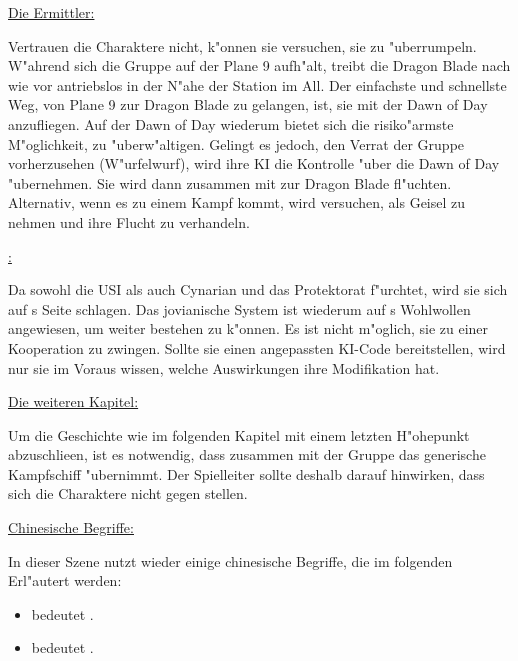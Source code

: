 \begin{remarks}	
	\underline{Die Ermittler:}
	
	Vertrauen die Charaktere \xl{} nicht, k"onnen sie versuchen, sie zu "uberrumpeln. W"ahrend sich die Gruppe auf der Plane 9 aufh"alt, treibt die Dragon Blade nach wie vor antriebslos in der N"ahe der Station im All. Der einfachste und schnellste Weg, von Plane 9 zur Dragon Blade zu gelangen, ist, sie mit der Dawn of Day anzufliegen. Auf der Dawn of Day wiederum bietet sich die risiko"armste M"oglichkeit, \xl{} zu "uberw"altigen. Gelingt es \xl{} jedoch, den Verrat der Gruppe vorherzusehen (W"urfelwurf), wird ihre KI die Kontrolle "uber die Dawn of Day "ubernehmen. Sie wird dann zusammen mit \ml{} zur Dragon Blade fl"uchten. Alternativ, wenn es zu einem Kampf kommt, wird \xl{} versuchen, \ml{} als Geisel zu nehmen und ihre Flucht zu verhandeln.

	\underline{\ml{}:}

	Da \ml{} sowohl die USI als auch Cynarian und das Protektorat f"urchtet, wird sie sich auf \xl{}s Seite schlagen. Das jovianische System ist wiederum auf \ml{}s Wohlwollen angewiesen, um weiter bestehen zu k"onnen. Es ist nicht m"oglich, sie zu einer Kooperation zu zwingen. Sollte sie einen angepassten KI-Code bereitstellen, wird nur sie im Voraus wissen, welche Auswirkungen ihre Modifikation hat.

	\underline{Die weiteren Kapitel:}

	Um die Geschichte wie im folgenden Kapitel mit einem letzten H"ohepunkt abzuschlie\3en, ist es notwendig, dass \xl{} zusammen mit der Gruppe das generische Kampfschiff "ubernimmt. Der Spielleiter sollte deshalb darauf hinwirken, dass sich die Charaktere nicht gegen \xl{} stellen.

	\underline{Chinesische Begriffe:}

	In dieser Szene nutzt \xl{} wieder einige chinesische Begriffe, die im folgenden Erl"autert werden:

	\begin{itemize}
		\item {} bedeutet .
		\item {} bedeutet .		
	\end{itemize}
	 
\end{remarks}
